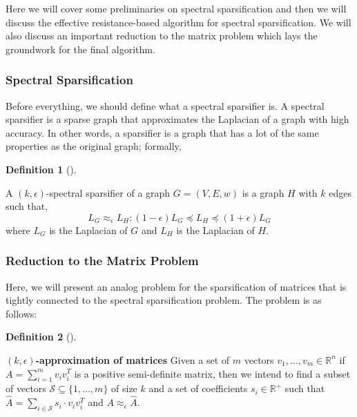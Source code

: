 \documentclass[
  letterpaper,
  DIV=11,
  numbers=noendperiod]{scrartcl}
\theoremstyle{plain}
\theoremstyle{plain}
\theoremstyle{plain}
\theoremstyle{definition}
\newtheorem{definition}{Definition}[section]
\theoremstyle{plain}
\theoremstyle{remark}
\begin{document}
Here we will cover some preliminaries on spectral sparsification and
then we will discuss the effective resistance-based algorithm for
spectral sparsification. We will also discuss an important reduction to
the matrix problem which lays the groundwork for the final algorithm.

\hypertarget{spectral-sparsification}{%
\subsubsection{Spectral Sparsification}\label{spectral-sparsification}}

Before everything, we should define what a spectral sparsifier is. A
spectral sparsifier is a sparse graph that approximates the Laplacian of
a graph with high accuracy. In other words, a sparsifier is a graph that
has a lot of the same properties as the original graph; formally,

\leavevmode{}%
\begin{definition}[]\label{def-spectral-sparsification}

A \((k, \epsilon)\)-spectral sparsifier of a graph \(G = (V, E, w)\) is
a graph \(H\) with \(k\) edges such that,
\[L_G \approx_\epsilon L_H : (1 - \epsilon) L_G \preceq L_H \preceq (1 + \epsilon) L_G\]
where \(L_G\) is the Laplacian of \(G\) and \(L_H\) is the Laplacian of
\(H\).

\end{definition}

\hypertarget{reduction-to-the-matrix-problem}{%
\subsubsection{Reduction to the Matrix
Problem}\label{reduction-to-the-matrix-problem}}

Here, we will present an analog problem for the sparsification of
matrices that is tightly connected to the spectral sparsification
problem. The problem is as follows:

\leavevmode{}%
\begin{definition}[]\label{def-matrix-approximation}

\textbf{\((k, \epsilon)\)-approximation of matrices} Given a set of
\(m\) vectors \(v_1, \ldots, v_m \in \mathbb{R}^n\) if
\(A = \sum_{i=1}^m v_iv_i^T\) is a positive semi-definite matrix, then
we intend to find a subset of vectors
\(\mathcal{S} \subseteq \{1, \ldots, m\}\) of size \(k\) and a set of
coefficients \(s_i \in \mathbb{R}^+\) such that
\(\hat{A} = \sum_{i \in \mathcal{S}} s_i \cdot v_i v_i^T\) and
\(A \approx_\epsilon \hat{A}\).

\end{definition}
\end{document}
